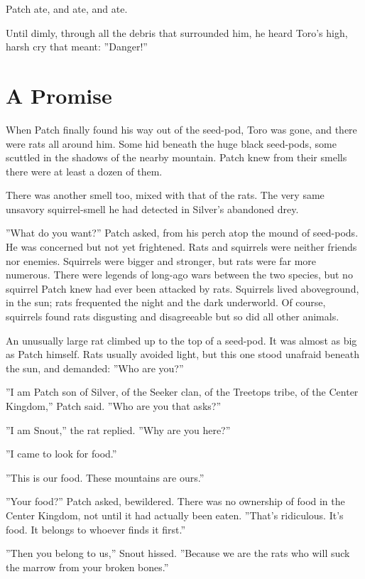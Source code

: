 \documentclass[12pt]{book}
\begin{document}
Patch ate, and ate, and ate.

Until dimly, through all the debris that surrounded him, he heard Toro's high, harsh cry that meant: ''Danger!''


\section{A Promise}

When Patch finally found his way out of the seed-pod, Toro was gone, and there were rats all around him. Some hid beneath the huge black seed-pods, some scuttled in the shadows of the nearby mountain. Patch knew from their smells there were at least a dozen of them.

There was another smell too, mixed with that of the rats. The very same unsavory squirrel-smell he had detected in Silver's abandoned drey.

''What do you want?'' Patch asked, from his perch atop the mound of seed-pods. He was concerned but not yet frightened. Rats and squirrels were neither friends nor enemies. Squirrels were bigger and stronger, but rats were far more numerous. There were legends of long-ago wars between the two species, but no squirrel Patch knew had ever been attacked by rats. Squirrels lived aboveground, in the sun; rats frequented the night and the dark underworld. Of course, squirrels found rats disgusting and disagreeable %
but so did all other animals.

An unusually large rat climbed up to the top of a seed-pod. It was almost as big as Patch himself. Rats usually avoided light, but this one stood unafraid beneath the sun, and demanded: ''Who are you?''

''I am Patch son of Silver, of the Seeker clan, of the Treetops tribe, of the Center Kingdom,'' Patch said. ''Who are you that asks?''

''I am Snout,'' the rat replied. ''Why are you here?''

''I came to look for food.''

''This is our food. These mountains are ours.''

''Your food?'' Patch asked, bewildered. There was no ownership of food in the Center Kingdom, not until it had actually been eaten. ''That's ridiculous. It's food. It belongs to whoever finds it first.''

''Then you belong to us,'' Snout hissed. ''Because we are the rats who will suck the marrow from your broken bones.''
\end{document}

